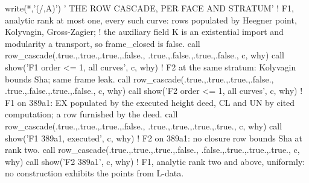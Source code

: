 \documentclass[10pt,twocolumn]{article}
\newenvironment{Shaded}{}{}
\newcommand{\CommentTok}[1]{#1}
\newcommand{\ConstantTok}[1]{#1}
\newcommand{\FunctionTok}[1]{#1}
\newcommand{\KeywordTok}[1]{#1}
\newcommand{\NormalTok}[1]{#1}
\newcommand{\StringTok}[1]{#1}
\providecommand{\CommentTok}[1]{#1}
\providecommand{\ConstantTok}[1]{#1}
\providecommand{\FunctionTok}[1]{#1}
\providecommand{\KeywordTok}[1]{#1}
\providecommand{\NormalTok}[1]{#1}
\providecommand{\StringTok}[1]{#1}
\providecommand{\textquotesingle}{'}
\providecommand{\CommentTok}[1]{#1}
\providecommand{\ConstantTok}[1]{#1}
\providecommand{\FunctionTok}[1]{#1}
\providecommand{\KeywordTok}[1]{#1}
\providecommand{\NormalTok}[1]{#1}
\providecommand{\StringTok}[1]{#1}
\begin{document}
\begin{strip}
\begin{Shaded}
\begin{Highlighting}[]
  \FunctionTok{write(*}\NormalTok{,}\StringTok{\textquotesingle{}(/,A)\textquotesingle{}}\FunctionTok{)} \StringTok{\textquotesingle{} THE ROW CASCADE, PER FACE AND STRATUM\textquotesingle{}}
  \CommentTok{! F1, analytic rank at most one, every such curve: rows populated by Heegner point, Kolyvagin, Gross{-}Zagier;}
  \CommentTok{! the auxiliary field K is an existential import and modularity a transport, so frame\_closed is false.}
  \KeywordTok{call}\NormalTok{ row\_cascade(}\ConstantTok{.true.}\NormalTok{,}\ConstantTok{.true.}\NormalTok{,}\ConstantTok{.true.}\NormalTok{,}\ConstantTok{.false.}\NormalTok{, }\ConstantTok{.true.}\NormalTok{,}\ConstantTok{.false.}\NormalTok{,}\ConstantTok{.true.}\NormalTok{,}\ConstantTok{.false.}\NormalTok{, c, why)}
  \KeywordTok{call}\NormalTok{ show(}\StringTok{\textquotesingle{}F1  order \textless{}= 1, all curves\textquotesingle{}}\NormalTok{, c, why)}
  \CommentTok{! F2 at the same stratum: Kolyvagin bounds Sha; same frame leak.}
  \KeywordTok{call}\NormalTok{ row\_cascade(}\ConstantTok{.true.}\NormalTok{,}\ConstantTok{.true.}\NormalTok{,}\ConstantTok{.true.}\NormalTok{,}\ConstantTok{.false.}\NormalTok{, }\ConstantTok{.true.}\NormalTok{,}\ConstantTok{.false.}\NormalTok{,}\ConstantTok{.true.}\NormalTok{,}\ConstantTok{.false.}\NormalTok{, c, why)}
  \KeywordTok{call}\NormalTok{ show(}\StringTok{\textquotesingle{}F2  order \textless{}= 1, all curves\textquotesingle{}}\NormalTok{, c, why)}
  \CommentTok{! F1 on 389a1: EX populated by the executed height deed, CL and UN by cited computation; a row furnished by the deed.}
  \KeywordTok{call}\NormalTok{ row\_cascade(}\ConstantTok{.true.}\NormalTok{,}\ConstantTok{.true.}\NormalTok{,}\ConstantTok{.true.}\NormalTok{,}\ConstantTok{.false.}\NormalTok{, }\ConstantTok{.true.}\NormalTok{,}\ConstantTok{.true.}\NormalTok{,}\ConstantTok{.true.}\NormalTok{,}\ConstantTok{.true.}\NormalTok{, c, why)}
  \KeywordTok{call}\NormalTok{ show(}\StringTok{\textquotesingle{}F1  389a1, executed\textquotesingle{}}\NormalTok{, c, why)}
  \CommentTok{! F2 on 389a1: no closure row bounds Sha at rank two.}
  \KeywordTok{call}\NormalTok{ row\_cascade(}\ConstantTok{.true.}\NormalTok{,}\ConstantTok{.true.}\NormalTok{,}\ConstantTok{.true.}\NormalTok{,}\ConstantTok{.false.}\NormalTok{, }\ConstantTok{.false.}\NormalTok{,}\ConstantTok{.true.}\NormalTok{,}\ConstantTok{.true.}\NormalTok{,}\ConstantTok{.true.}\NormalTok{, c, why)}
  \KeywordTok{call}\NormalTok{ show(}\StringTok{\textquotesingle{}F2  389a1\textquotesingle{}}\NormalTok{, c, why)}
  \CommentTok{! F1, analytic rank two and above, uniformly: no construction exhibits the points from L{-}data.}

\end{Highlighting}
\end{Shaded}
\end{strip}
\end{document}
